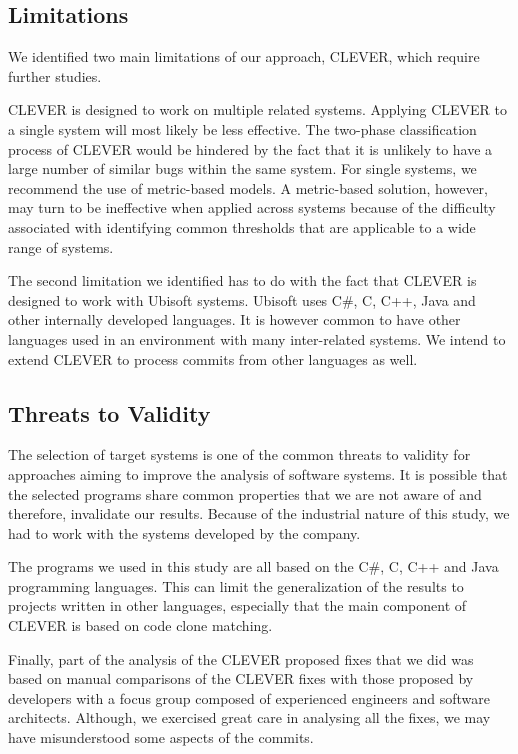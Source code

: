 \documentclass[sigconf]{acmart}
\begin{document}
\subsection{Limitations}\label{limitations}

We identified two main limitations of our approach, CLEVER, which
require further studies.

CLEVER is designed to work on multiple related systems. Applying CLEVER
to a single system will most likely be less effective. The two-phase
classification process of CLEVER would be hindered by the fact that it
is unlikely to have a large number of similar bugs within the same
system. For single systems, we recommend the use of metric-based models.
A metric-based solution, however, may turn to be ineffective when
applied across systems because of the difficulty associated with
identifying common thresholds that are applicable to a wide range of
systems.

The second limitation we identified has to do with the fact that CLEVER
is designed to work with Ubisoft systems. Ubisoft uses C\#, C, C++, Java
and other internally developed languages. It is however common to have
other languages used in an environment with many inter-related systems.
We intend to extend CLEVER to process commits from other languages as
well.

\subsection{Threats to Validity}\label{threats-to-validity}

The selection of target systems is one of the common threats to validity
for approaches aiming to improve the analysis of software systems. It is
possible that the selected programs share common properties that we are
not aware of and therefore, invalidate our results. Because of the
industrial nature of this study, we had to work with the systems
developed by the company.

The programs we used in this study are all based on the C\#, C, C++ and
Java programming languages. This can limit the generalization of the
results to projects written in other languages, especially that the main
component of CLEVER is based on code clone matching.

Finally, part of the analysis of the CLEVER proposed fixes that we did
was based on manual comparisons of the CLEVER fixes with those proposed
by developers with a focus group composed of experienced engineers and
software architects. Although, we exercised great care in analysing all
the fixes, we may have misunderstood some aspects of the commits.
\end{document}

